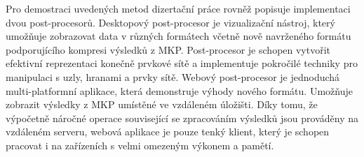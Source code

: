 Pro demostraci uveden\'ych metod dizerta\v{c}n\'i pr\'ace rovn\v{e}\v{z} popisuje implementaci dvou post-procesor\r{u}. Desktopov\'y post-procesor je vizualiza\v{c}n\'i n\'astroj, kter\'y umo\v{z}\v{n}uje zobrazovat data v r\r{u}zn\'ych form\'atech v\v{c}etn\v{e} nov\v{e} navr\v{z}en\'eho form\'atu podporuj\'ic\'iho kompresi v\'ysledk\r{u} z MKP. Post-procesor je schopen vytvo\v{r}it efektivn\'i reprezentaci kone\v{c}n\v{e} prvkov\'e s\'it\v{e} a implementuje pokro\v{c}il\'e techniky pro manipulaci s uzly, hranami a prvky s\'it\v{e}. Webov\'y post-procesor je jednoduch\'a multi-platformn\'i aplikace, kter\'a demonstruje v\'yhody nov\'eho form\'atu. Umo\v{z}\v{n}uje zobrazit v\'ysledky z MKP um\'ist\v{e}n\'e ve vzd\'alen\'em \'ulo\v{z}i\v{s}ti. D\'iky tomu, \v{z}e v\'ypo\v{c}etn\v{e} n\'aro\v{c}n\'e operace souvisej\'ic\'i se zpracov\'an\'im v\'ysledk\r{u} jsou prov\'ad\v{e}ny na vzd\'alen\'em serveru, webov\'a aplikace je pouze tenk\'y klient, kter\'y je schopen pracovat i na za\v{r}\'izen\'ich s velmi omezen\'ym v\'ykonem a pam\v{e}t\'i.\\

